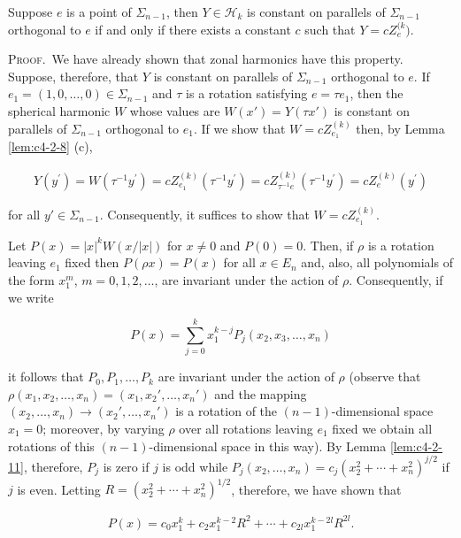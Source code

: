\begin{theorem}
\label{thm:c4-2-12}
Suppose $e$ is a point of $\Sigma_{n-1}$, then $Y \in \mathcal{H}_k$ is constant on parallels of $\Sigma_{n-1}$ orthogonal to $e$ if and only if there exists a constant $c$ such that $Y = c Z_e^{(k})$.
\end{theorem}

\textsc{Proof.}\ We have already shown that zonal harmonics have this property. Suppose, therefore, that $Y$ is constant on parallels of $\Sigma_{n-1}$ orthogonal to $e$. If $e_1 = (1, 0, \ldots, 0) \in \Sigma_{n-1}$ and $\tau$ is a rotation satisfying $e = \tau e_1$, then the spherical harmonic $W$ whose values are $W(x') = Y(\tau x')$ is constant on parallels of $\Sigma_{n-1}$ orthogonal to $e_1$. If we show that $W = c Z_{e_1}^{(k)}$ then, by Lemma \ref{lem:c4-2-8} (c),

\[
\begin{array}{r}{Y(y^{\prime})=W(\tau^{-1}y^{\prime})=c Z_{e_{1}}^{(k)}(\tau^{-1}y^{\prime})=c Z_{\tau^{-1}e}^{(k)}(\tau^{-1}y^{\prime})=c Z_{e}^{(k)}(y^{\prime})}\end{array}
\]

for all $y' \in \Sigma_{n-1}$. Consequently, it suffices to show that $W = cZ_{e_1}^{(k)}$.

Let $P(x) = |x|^k W(x/|x|)$ for $x \neq 0$ and $P(0) = 0$. Then, if $\rho$ is a rotation leaving $e_1$ fixed then $P(\rho x) = P(x)$ for all $x \in E_n$ and, also, all polynomials of the form $x_1^m$, $m = 0, 1, 2, \ldots$, are invariant under the action of $\rho$. Consequently, if we write

\[
P(x)=\sum_{j=0}^{k}x_{1}^{k-j}P_{j}(x_{2},x_{3},\ldots,x_{n})
\]

it follows that $P_0, P_1, \ldots, P_k$ are invariant under the action of $\rho$ (observe that $\rho(x_1, x_2, \ldots, x_n) = (x_1, x_2', \ldots, x_n')$ and the mapping $(x_2, \ldots, x_n) \to (x_2', \ldots, x_n')$ is a rotation of the $(n-1)$-dimensional space $x_1 = 0$; moreover, by varying $\rho$ over all rotations leaving $e_1$ fixed we obtain all rotations of this $(n-1)$-dimensional space in this way). By Lemma \ref{lem:c4-2-11}, therefore, $P_j$ is zero if $j$ is odd while $P_j(x_2, \ldots, x_n) = c_j(x_2^2 + \cdots + x_n^2)^{j/2}$ if $j$ is even. Letting $R = (x_2^2 + \cdots + x_n^2)^{1/2}$, therefore, we have shown that

\begin{equation}
\tag{i}
\begin{array}{r}{P(x)=c_{0}x_{1}^{k}+c_{2}x_{1}^{k-2}R^{2}+\cdots+c_{2l}x_{1}^{k-2l}R^{2l}.}\end{array}
\end{equation}

